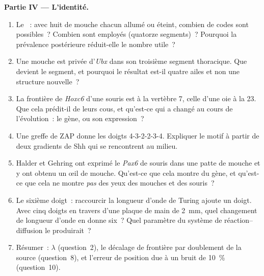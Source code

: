 \begin{problem}
\medskip
\noindent\textbf{Partie IV --- L'identité.}
\begin{enumerate}[resume]
  \item Le ~: avec huit  de mouche chacun allumé ou
        éteint, combien de codes sont possibles~? Combien sont employés
        (quatorze segments)~? Pourquoi la prévalence postérieure
        réduit-elle le nombre utile~?
  \item Une mouche est privée d'\emph{Ubx} dans son troisième segment
        thoracique. Que devient le segment, et pourquoi le résultat est-il
        quatre ailes et non une structure nouvelle~?
  \item La frontière de \emph{Hoxc6} d'une souris est à la vertèbre 7,
        celle d'une oie à la 23. Que cela prédit-il de leurs cous, et
        qu'est-ce qui a changé au cours de l'évolution~: le gène, ou son
        expression~?
  \item Une greffe de ZAP donne les doigts 4-3-2-2-3-4. Expliquer le
        motif à partir de deux gradients de Shh qui se rencontrent au
        milieu.
  \item Halder et Gehring ont exprimé le \emph{Pax6} de souris dans une
        patte de mouche et y ont obtenu un œil de mouche. Qu'est-ce que
        cela montre du gène, et qu'est-ce que cela ne montre \emph{pas}
        des yeux des mouches et des souris~?
  \item Le sixième doigt~: raccourcir la longueur d'onde de Turing ajoute
        un doigt. Avec cinq doigts en travers d'une plaque de main de
        \qty{2}{mm}, quel changement de longueur d'onde en donne six~?
        Quel paramètre du système de réaction--diffusion le produirait~?
  \item Résumer~: $\lambda$ (question~2), le décalage de frontière par
        doublement de la source (question~8), et l'erreur de position due
        à un bruit de \qty{10}{\%} (question~10).
\end{enumerate}
\end{problem}
